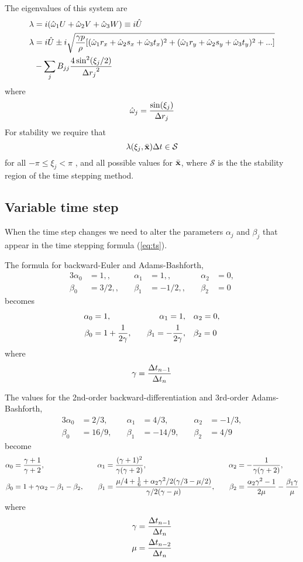 \documentclass[10pt]{article}
\begin{document}
\newcommand{\omegah}{{\hat{\omega}}}
The eigenvalues of this system are
\begin{align}
  \lambda & = i ( \omegah_1 U + \omegah_2 V + \omegah_3 W ) \equiv i \hat{U} \\
  \lambda & = i \hat{U} \pm i \sqrt{ {\gamma p \over \rho}
         [ (\omegah_1 r_x + \omegah_2 s_x + \omegah_3 t_x)^2
          +(\omegah_1 r_y + \omegah_2 s_y + \omegah_3 t_y)^2 + ... ] }   \\
    &     - \sum_j B_{jj}  {4 \sin^2( \xi_j/2)\over {\Delta r_j}^2 }
\end{align}
where
\[
    \omegah_j = { \sin(\xi_j) \over \Delta r_j }
\]
For stability we require that
\[
     \lambda(\xi_j,\bar{{\bf x}}) {\Delta t} \in \mathcal{S}
\]
for all $-\pi \le \xi_j < \pi$ , and all possible values for $\bar{{\bf x}}$,
where $\mathcal{S}$ is the 
the stability region of the time stepping method.



\subsection{Variable time step}

When the time step changes we need to alter the parameters $\alpha_j$ and $\beta_j$
that appear in the time stepping formula (\ref{eq:ts}).


The formula for backward-Euler and Adams-Bashforth,
\begin{alignat*}{3}
 \alpha_0&=1, , &\quad \alpha_1&=1, , &\quad \alpha_2&=0, \\
 \beta_0&=3/2,, &\quad  \beta_1&=-1/2, , &\quad \beta_2&=0
\end{alignat*}
becomes
\begin{alignat}{3}
\alpha_0&=1,  &\quad \alpha_1=1,   &\quad  \alpha_2=0, \\
\beta_0&=1+{1\over 2\gamma},  &\quad \beta_1=-{1\over 2\gamma}, &\quad \beta_2=0
\end{alignat}
where
\[
   \gamma = { \Delta t_{n-1} \over \Delta t_{n} }
\]

The values for the 2nd-order backward-differentiation and 3rd-order Adams-Bashforth,
\begin{alignat*}{3}
 \alpha_0&=2/3, &\quad \alpha_1&=4/3,  &\quad \alpha_2&=-1/3, \\
 \beta_0&=16/9,  &\quad \beta_1&=-14/9, &\quad  \beta_2&=4/9 
\end{alignat*}
become
\begin{alignat}{3}
 \alpha_0&={\gamma+1\over \gamma+2}, &\quad \alpha_1&={(\gamma+1)^2\over \gamma(\gamma+2)},  
                                      &\quad \alpha_2&=-{1\over \gamma(\gamma+2)}, \\
 \beta_0 &=1+\gamma\alpha_2-\beta_1-\beta_2,        &\quad 
 \beta_1 &={ \mu/4 +{1\over 6} + \alpha_2\gamma^2/2(\gamma/3-\mu/2) \over \gamma/2(\gamma-\mu)}, &\quad 
 \beta_2 &={\alpha_2\gamma^2-1\over 2\mu} -{\beta_1\gamma \over \mu}
\end{alignat}
where
\begin{align*}
   \gamma & = { \Delta t_{n-1} \over \Delta t_{n} } \\
   \mu & = { \Delta t_{n-2} \over \Delta t_{n} } 
\end{align*}
\end{document}
